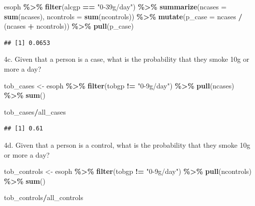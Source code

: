 \documentclass[
]{article}
\newenvironment{Shaded}{\begin{snugshade}}{\end{snugshade}}
\newcommand{\DataTypeTok}[1]{\textcolor[rgb]{0.13,0.29,0.53}{#1}}
\newcommand{\KeywordTok}[1]{\textcolor[rgb]{0.13,0.29,0.53}{\textbf{#1}}}
\newcommand{\NormalTok}[1]{#1}
\newcommand{\OperatorTok}[1]{\textcolor[rgb]{0.81,0.36,0.00}{\textbf{#1}}}
\newcommand{\StringTok}[1]{\textcolor[rgb]{0.31,0.60,0.02}{#1}}
\begin{document}
\begin{Shaded}
\begin{Highlighting}[]
\NormalTok{esoph }\OperatorTok{\%\textgreater{}\%}
\StringTok{  }\KeywordTok{filter}\NormalTok{(alcgp }\OperatorTok{==}\StringTok{ "0{-}39g/day"}\NormalTok{) }\OperatorTok{\%\textgreater{}\%}
\StringTok{  }\KeywordTok{summarize}\NormalTok{(}\DataTypeTok{ncases =} \KeywordTok{sum}\NormalTok{(ncases), }\DataTypeTok{ncontrols =} \KeywordTok{sum}\NormalTok{(ncontrols)) }\OperatorTok{\%\textgreater{}\%}
\StringTok{  }\KeywordTok{mutate}\NormalTok{(}\DataTypeTok{p\_case =}\NormalTok{ ncases }\OperatorTok{/}\StringTok{ }\NormalTok{(ncases }\OperatorTok{+}\StringTok{ }\NormalTok{ncontrols)) }\OperatorTok{\%\textgreater{}\%}
\StringTok{  }\KeywordTok{pull}\NormalTok{(p\_case)}
\end{Highlighting}
\end{Shaded}

\begin{verbatim}
## [1] 0.0653
\end{verbatim}

4c. Given that a person is a case, what is the probability that they
smoke 10g or more a day?

\begin{Shaded}
\begin{Highlighting}[]
\NormalTok{tob\_cases \textless{}{-}}\StringTok{ }\NormalTok{esoph }\OperatorTok{\%\textgreater{}\%}
\StringTok{  }\KeywordTok{filter}\NormalTok{(tobgp }\OperatorTok{!=}\StringTok{ "0{-}9g/day"}\NormalTok{) }\OperatorTok{\%\textgreater{}\%}
\StringTok{  }\KeywordTok{pull}\NormalTok{(ncases) }\OperatorTok{\%\textgreater{}\%}
\StringTok{  }\KeywordTok{sum}\NormalTok{()}

\NormalTok{tob\_cases}\OperatorTok{/}\NormalTok{all\_cases}
\end{Highlighting}
\end{Shaded}

\begin{verbatim}
## [1] 0.61
\end{verbatim}

4d. Given that a person is a control, what is the probability that they
smoke 10g or more a day?

\begin{Shaded}
\begin{Highlighting}[]
\NormalTok{tob\_controls \textless{}{-}}\StringTok{ }\NormalTok{esoph }\OperatorTok{\%\textgreater{}\%}
\StringTok{  }\KeywordTok{filter}\NormalTok{(tobgp }\OperatorTok{!=}\StringTok{ "0{-}9g/day"}\NormalTok{) }\OperatorTok{\%\textgreater{}\%}
\StringTok{  }\KeywordTok{pull}\NormalTok{(ncontrols) }\OperatorTok{\%\textgreater{}\%}
\StringTok{  }\KeywordTok{sum}\NormalTok{()}

\NormalTok{tob\_controls}\OperatorTok{/}\NormalTok{all\_controls}
\end{Highlighting}
\end{Shaded}
\end{document}
